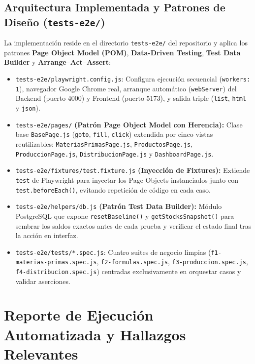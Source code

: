 \documentclass[11pt,a4paper]{article}
\begin{document}
\subsection{Arquitectura Implementada y Patrones de Diseño (\texttt{tests-e2e/})}
La implementación reside en el directorio \texttt{tests-e2e/} del repositorio y aplica los patrones \textbf{Page Object Model (POM)}, \textbf{Data-Driven Testing}, \textbf{Test Data Builder} y \textbf{Arrange--Act--Assert}:
\begin{itemize}[noitemsep]
    \item \texttt{tests-e2e/playwright.config.js}: Configura ejecución secuencial (\texttt{workers: 1}), navegador Google Chrome real, arranque automático (\texttt{webServer}) del Backend (puerto 4000) y Frontend (puerto 5173), y salida triple (\texttt{list}, \texttt{html} y \texttt{json}).
    \item \texttt{tests-e2e/pages/} \textbf{(Patrón Page Object Model con Herencia):} Clase base \texttt{BasePage.js} (\texttt{goto}, \texttt{fill}, \texttt{click}) extendida por cinco vistas reutilizables: \texttt{MateriasPrimasPage.js}, \texttt{ProductosPage.js}, \texttt{ProduccionPage.js}, \texttt{DistribucionPage.js} y \texttt{DashboardPage.js}.
    \item \texttt{tests-e2e/fixtures/test.fixture.js} \textbf{(Inyección de Fixtures):} Extiende \texttt{test} de Playwright para inyectar los Page Objects instanciados junto con \texttt{test.beforeEach()}, evitando repetición de código en cada caso.
    \item \texttt{tests-e2e/helpers/db.js} \textbf{(Patrón Test Data Builder):} Módulo PostgreSQL que expone \texttt{resetBaseline()} y \texttt{getStocksSnapshot()} para sembrar los saldos exactos antes de cada prueba y verificar el estado final tras la acción en interfaz.
    \item \texttt{tests-e2e/tests/*.spec.js}: Cuatro suites de negocio limpias (\texttt{f1-materias-primas.spec.js}, \texttt{f2-formulas.spec.js}, \texttt{f3-produccion.spec.js}, \texttt{f4-distribucion.spec.js}) centradas exclusivamente en orquestar casos y validar aserciones.
\end{itemize}

\section{Reporte de Ejecución Automatizada y Hallazgos Relevantes}
\end{document}
